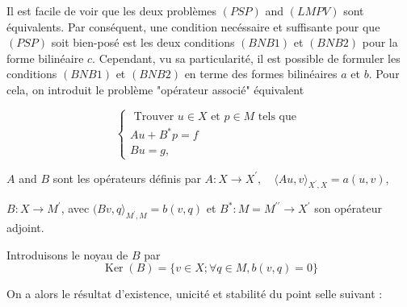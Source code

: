 Il est facile de voir que les deux problèmes $(PSP)$ and $(LMPV)$ sont équivalents. Par conséquent,  une condition  necéssaire et suffisante pour que $(PSP)$ soit bien-posé est les deux conditions $(BNB1)$ et  $(BNB2)$  pour la forme bilinéaire $c$.  Cependant,  vu  sa particularité, il est possible de formuler les conditions  $(BNB1)$  et  $(BNB2)$ en terme des formes bilinéaires $a$ et $b$. Pour cela, on introduit le problème "opérateur associé" équivalent

$$
\left\{\begin{array}{l}
	\text { Trouver } u \in X \text {  et  } p \in M \text { tels que  } \\
	A u+B^{*} p=f \\
	B u=g,
\end{array}\right.
$$



 $A$ and $B$ sont les opérateurs définis par  $A: X \rightarrow X^{\prime},    \quad \langle A u, v\rangle_{X^{\prime}, X}=a(u, v)$,   
 
 $B: X \rightarrow M^{\prime}$, avec $(B v, q\rangle_{M^{\prime}, M}=b(v, q)$  et 
 $B^{*}: M=M^{\prime \prime} \rightarrow X^{\prime}$ son opérateur adjoint. 

Introduisons  le noyau de $B$ par  
$$
\operatorname{Ker}(B)=\{v \in X ; \forall q \in M, b(v, q)=0\}
$$ 

%


On a alors le résultat d'existence, unicité et stabilité du point selle suivant :


